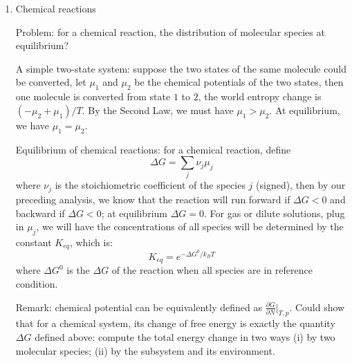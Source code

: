 \documentclass{report}
\begin{document}
\begin{enumerate}
\item{Chemical reactions}

Problem: for a chemical reaction, the distribution of molecular species at equilibrium?

A simple two-state system: suppose the two states of the same molecule could be converted, let $\mu_1$ and $\mu_2$ be the chemical potentials of the two states, then one molecule is converted from state $1$ to $2$, the world entropy change is $(-\mu_2 + \mu_1) / T$. By the Second Law, we must have $\mu_1 > \mu_2$. At equilibrium, we have $\mu_1 = \mu_2$. 

Equilibrium of chemical reactions: for a chemical reaction, define 
\begin{equation}
\Delta G = \sum_j{\nu_j \mu_j}
\end{equation}
where $\nu_j$ is the stoichiometric coefficient of the species $j$ (signed), then by our preceding analysis, we know that the reaction will run forward if $\Delta G < 0$ and backward if $\Delta G <0$; at equilibrium $\Delta G = 0$. For gas or dilute solutions, plug in $\mu_j$, we will have the concentrations of all species will be determined by the constant $K_{eq}$, which is: 
\begin{equation}
K_{eq} = e^{-\Delta G^0 / k_B T}
\end{equation}
where $\Delta G^0$ is the $\Delta G$ of the reaction when all species are in reference condition. 

Remark: chemical potential can be equivalently defined as $\frac{\partial G}{\partial N} \vert_{T,p}$. Could show that for a chemical system, its change of free energy is exactly the quantity $\Delta G$ defined above: compute the total energy change in two ways (i) by two molecular species; (ii) by the subsystem and its environment. 

\end{enumerate}



  
\end{document}
